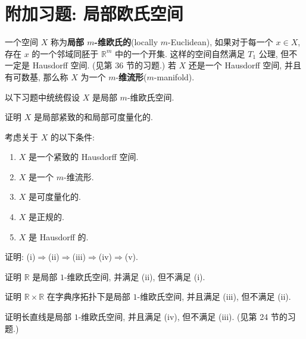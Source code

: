 ﻿\section*{附加习题: 局部欧氏空间}
\label{section:ch08-extra}

\begin{remark}
一个空间 $X$ 称为\textbf{局部 $m$-维欧氏的}(locally $m$-Euclidean), 如果对于每一个 $x\in X$, 存在 $x$ 的一个邻域同胚于 $\mathbb{R}^{m}$ 中的一个开集. 这样的空间自然满足 $T_1$ 公理, 但不一定是 Hausdorff 空间. (见第 36 节的习题.) 若 $X$ 还是一个 Hausdorff 空间, 并且有可数基, 那么称 $X$ 为一个 $m$-\textbf{维流形}($m$-manifold).

以下习题中统统假设 $X$ 是局部 $m$-维欧氏空间.
\end{remark}

\begin{exercise}
证明 $X$ 是局部紧致的和局部可度量化的.
\end{exercise}

\begin{exercise}
考虑关于 $X$ 的以下条件:
\begin{enumerate}
\item $X$ 是一个紧致的 Hausdorff 空间.
\item $X$ 是一个 $m$-维流形.
\item $X$ 是可度量化的.
\item $X$ 是正规的.
\item $X$ 是 Hausdorff 的.
\end{enumerate}
证明: (i)$\Rightarrow$(ii)$\Rightarrow$(iii)$\Rightarrow$(iv)$\Rightarrow$(v).
\end{exercise}

\begin{exercise}
证明 $\mathbb{R}$ 是局部 $1$-维欧氏空间, 并满足 (ii), 但不满足 (i).
\end{exercise}

\begin{exercise}
证明 $\mathbb{R}\times\mathbb{R}$ 在字典序拓扑下是局部 $1$-维欧氏空间, 并且满足 (iii), 但不满足 (ii).
\end{exercise}

\begin{exercise}
证明长直线是局部 $1$-维欧氏空间, 并且满足 (iv), 但不满足 (iii). (见第 24 节的习题.)
\end{exercise}

